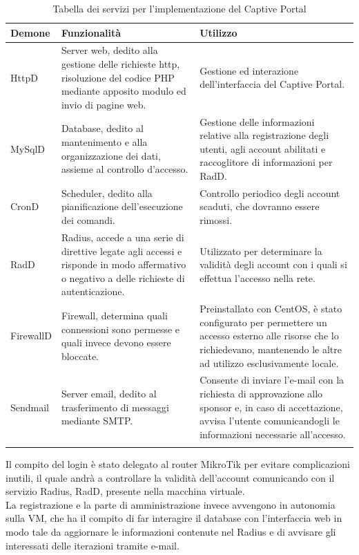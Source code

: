 \documentclass[Realizzazione.tex]{subfiles}
\begin{document}

\label{table:Tabella dei servizi per l'implementazione del Captive Portal}
\renewcommand*{\arraystretch}{1.2}
\begin{longtable}[H]{p{2.6cm}|p{6cm}|p{6cm}}
	\rowcolor{CHeader}
	\color{CHeaderText} \textbf{Demone} & \color{CHeaderText} \textbf{Funzionalità} & \color{CHeaderText} \textbf{Utilizzo} \\
	\endhead
		HttpD
			& Server web, dedito alla gestione delle richieste http, risoluzione del codice PHP mediante apposito modulo ed invio di pagine web.
			&  Gestione ed interazione dell'interfaccia del Captive Portal. \\
		MySqlD
			& Database, dedito al mantenimento e alla organizzazione dei dati, assieme al controllo d'accesso.
			& Gestione delle informazioni relative alla registrazione degli utenti, agli account abilitati e raccoglitore di informazioni per RadD. \\
		CronD
			& Scheduler, dedito alla pianificazione dell'esecuzione dei comandi.
			& Controllo periodico degli account scaduti, che dovranno essere rimossi. \\
		RadD
			& Radius, accede a una serie di direttive legate agli accessi e risponde in modo affermativo o negativo a delle richieste di autenticazione.
			& Utilizzato per determinare la validità degli account con i quali si effettua l'accesso nella rete. \\
		FirewallD
			& Firewall, determina quali connessioni sono permesse e quali invece devono essere bloccate.
			& Preinstallato con CentOS, è stato configurato per permettere un accesso esterno alle risorse che lo richiedevano, mantenendo le altre ad utilizzo esclusivamente locale. \\
		Sendmail
			& Server email, dedito al trasferimento di messaggi mediante SMTP.
			& Consente di inviare l'e-mail con la richiesta di approvazione allo sponsor e, in caso di accettazione, avvisa l'utente comunicandogli le informazioni necessarie all'accesso. \\
	\hiderowcolors
	\caption{Tabella dei servizi per l'implementazione del Captive Portal}
\end{longtable}

Il compito del login è stato delegato al router MikroTik per evitare complicazioni inutili, il quale andrà a controllare la validità dell'account comunicando con il servizio Radius, RadD, presente nella macchina virtuale. \\
La registrazione e la parte di amministrazione invece avvengono in autonomia sulla VM, che ha il compito di far interagire il database con l'interfaccia web in modo tale da aggiornare le informazioni contenute nel Radius e di avvisare gli interessati delle iterazioni tramite e-mail. \\\\
\end{document}
